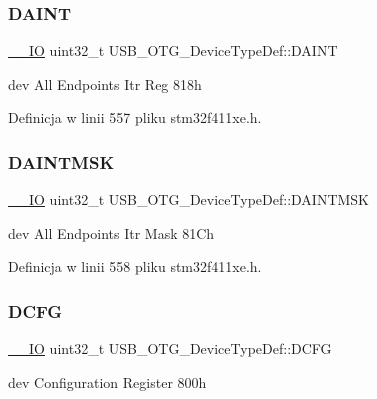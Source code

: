 \subsubsection{\texorpdfstring{D\+A\+I\+NT}{DAINT}}
{\footnotesize\ttfamily \hyperlink{core__sc300_8h_aec43007d9998a0a0e01faede4133d6be}{\+\_\+\+\_\+\+IO} uint32\+\_\+t U\+S\+B\+\_\+\+O\+T\+G\+\_\+\+Device\+Type\+Def\+::\+D\+A\+I\+NT}

dev All Endpoints Itr Reg 818h 

Definicja w linii 557 pliku stm32f411xe.\+h.

\mbox{\label{struct_u_s_b___o_t_g___device_type_def_a26dc7ee19b8bd8c82378575cfddface4}} 
\subsubsection{\texorpdfstring{D\+A\+I\+N\+T\+M\+SK}{DAINTMSK}}
{\footnotesize\ttfamily \hyperlink{core__sc300_8h_aec43007d9998a0a0e01faede4133d6be}{\+\_\+\+\_\+\+IO} uint32\+\_\+t U\+S\+B\+\_\+\+O\+T\+G\+\_\+\+Device\+Type\+Def\+::\+D\+A\+I\+N\+T\+M\+SK}

dev All Endpoints Itr Mask 81\+Ch 

Definicja w linii 558 pliku stm32f411xe.\+h.

\mbox{\label{struct_u_s_b___o_t_g___device_type_def_a9a9dac417f09f6a2d9a4b3110aa99b53}} 
\subsubsection{\texorpdfstring{D\+C\+FG}{DCFG}}
{\footnotesize\ttfamily \hyperlink{core__sc300_8h_aec43007d9998a0a0e01faede4133d6be}{\+\_\+\+\_\+\+IO} uint32\+\_\+t U\+S\+B\+\_\+\+O\+T\+G\+\_\+\+Device\+Type\+Def\+::\+D\+C\+FG}

dev Configuration Register 800h 

